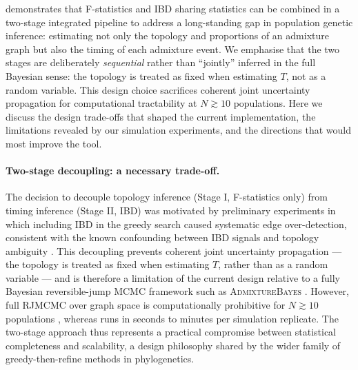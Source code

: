 
\hapgraph{} demonstrates that F-statistics and IBD sharing statistics can be
combined in a two-stage integrated pipeline to address a long-standing gap
in population genetic inference: estimating not only the topology and
proportions of an admixture graph but also the timing of each admixture event.
We emphasise that the two stages are deliberately \emph{sequential} rather
than ``jointly'' inferred in the full Bayesian sense: the topology is treated
as fixed when estimating $T$, not as a random variable.
This design choice sacrifices coherent joint uncertainty propagation for
computational tractability at $N \gtrsim 10$ populations.
Here we discuss the design trade-offs that shaped the current implementation,
the limitations revealed by our simulation experiments, and the directions
that would most improve the tool.

\paragraph{Two-stage decoupling: a necessary trade-off.}
The decision to decouple topology inference (Stage I, F-statistics only) from
timing inference (Stage II, IBD) was motivated by preliminary experiments in
which including IBD in the greedy search caused systematic edge over-detection,
consistent with the known confounding between IBD signals and topology ambiguity
\citep{Loh2013}.
This decoupling prevents coherent joint uncertainty propagation — the
topology is treated as fixed when estimating $T$, rather than as a random
variable — and is therefore a limitation of the current design relative to
a fully Bayesian reversible-jump MCMC framework such as
\textsc{AdmixtureBayes} \citep{Nielsen2023}.
However, full RJMCMC over graph space is computationally prohibitive for
$N \gtrsim 10$ populations \citep{Nielsen2023}, whereas \hapgraph{} runs
in seconds to minutes per simulation replicate.
The two-stage approach thus represents a practical compromise between
statistical completeness and scalability, a design philosophy shared by the
wider family of greedy-then-refine methods in phylogenetics.

